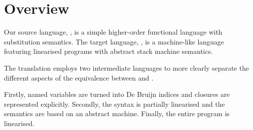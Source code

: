

\section{Overview}
Our source language, \hlang, is a simple higher-order functional language with substitution semantics.
The target language, \mlang, is a machine-like language featuring linearised programs with abstract stack machine semantics.

The translation employs two intermediate languages to more clearly separate the different aspects of the equivalence between \hlang and \mlang.

Firstly, named variables are turned into De Bruijn indices and closures are represented explicitly.
Secondly, the syntax is partially linearised and the semantics are based on an abstract machine.
Finally, the entire program is linearised.
